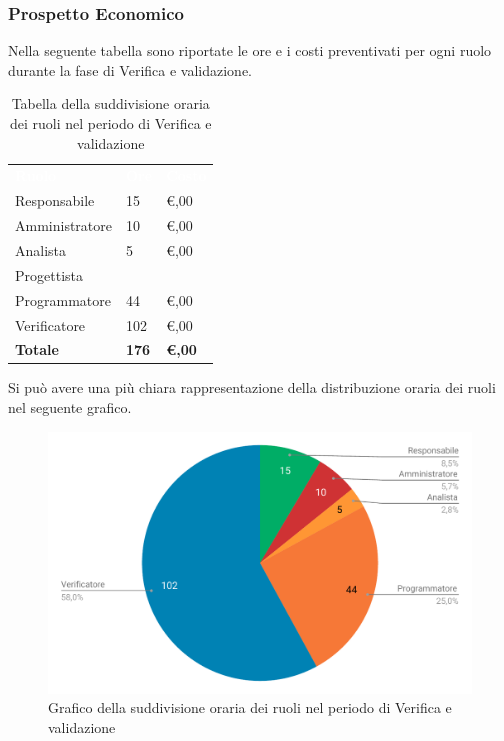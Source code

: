 \subsubsection{Prospetto Economico}
Nella seguente tabella sono riportate le ore e i costi preventivati per ogni ruolo durante la fase di Verifica e validazione.


\begin{table}[H]	
	\begin{center}
	    \begin{tabular}{C{4cm}C{1cm}C{3,5cm}}
			\textcolor{white}{\textbf{Ruolo}} & \textcolor{white}{\textbf{Ore}} & \textcolor{white}{\textbf{Costo}}
			\\
			Responsabile & 15 & \euro {},00 \\
			Amministratore & 10 & \euro {},00 \\
			Analista & 5 & \euro {},00 \\
			Progettista &  & \space \\
			Programmatore & 44 & \euro {},00 \\
			Verificatore & 102 & \euro {},00 \\
			\textbf{Totale} & \textbf{176} & \textbf{\euro {},00} \\
		\end{tabular}
	    \caption{Tabella della suddivisione oraria dei ruoli nel periodo di Verifica e validazione} \label{tab:tabellaRuoliVerifica e validazione} 
	\end{center}
\end{table}


Si può avere una più chiara rappresentazione della distribuzione oraria dei ruoli nel seguente grafico.

\begin{figure}[H]
	\includegraphics[width=1\linewidth]{Preventivo/grafici/VV2.pdf}
	\caption{Grafico della suddivisione oraria dei ruoli nel periodo di Verifica e validazione}
\end{figure}

